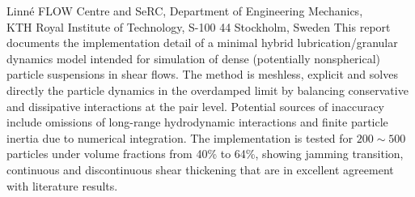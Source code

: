 %
%
%
%
%
%
%
\paperaffiliation
{%
  Linn\'e FLOW Centre and SeRC, Department of Engineering Mechanics,\\
  KTH Royal Institute of Technology, S-100 44 Stockholm, Sweden%
}%
%
%
%
\papervolume{}%
%
\papernumber{}
%
\paperpages{}%
%
%
%
\papersummary%
{%
   This report documents the implementation detail of a minimal hybrid lubrication/granular dynamics model
   intended for simulation of dense (potentially nonspherical) particle suspensions in shear flows.
   The method is meshless, explicit and solves directly the particle dynamics in the overdamped limit
   by balancing conservative and dissipative interactions at the pair level.
   Potential sources of inaccuracy include omissions of long-range hydrodynamic interactions and finite particle inertia due to numerical integration.
   The implementation is tested for $200\sim 500$ particles under volume fractions from 40\% to 64\%,
   showing jamming transition, continuous and discontinuous shear thickening that are in excellent agreement with literature results.
}%
%
\graphicspath{{paper7/}}%
%
%
%
